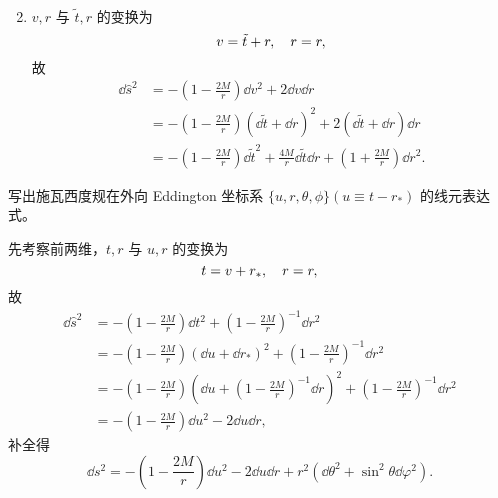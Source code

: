 \begin{xiti}
\begin{zm}
\begin{enumerate}
\begin{align*}
				\end{align*}
			\item $v, r$ 与 $\tilde{t}, r$ 的变换为
				\begin{equation*}
					v = \tilde{t} + r \qc r =r,
				\end{equation*}
				故
				\begin{align*}
					\dd \hat{s}^2 &= - \left( 1 - \frac{2M}{r} \right) \dd{v}^2 + 2 \dd{v} \dd{r}\\
					&= - \left( 1 - \frac{2M}{r} \right) \left( \dd{\tilde{t}} + \dd{r} \right)^2 + 2 \left( \dd{\tilde{t}} + \dd{r} \right) \dd{r}\\
					&= - \left( 1 - \frac{2M}{r} \right) \dd{\tilde{t}}^2 + \frac{4M}{r} \dd{\tilde{t}} \dd{r} + \left( 1 + \frac{2M}{r} \right) \dd{r}^2.
				\end{align*}
		\end{enumerate}
	\end{zm}

	\item 写出施瓦西度规在外向 Eddington 坐标系 $\{ u,r, \theta, \phi \}(u \equiv t - r_*)$ 的线元表达式。

	\begin{jie}
		先考察前两维，$t,r$ 与 $u,r$ 的变换为
		\begin{equation*}
			t = v + r_* \qc r = r,
		\end{equation*}
		故
		\begin{align*}
			\dd \hat{s}^2 &= - \left( 1 - \frac{2M}{r} \right) \dd t^2 + \left( 1 - \frac{2M}{r} \right)^{-1} \dd{r}^2\\
			&= - \left( 1 - \frac{2M}{r} \right) \left( \dd{u} + \dd{r_*} \right)^2 + \left( 1 - \frac{2M}{r} \right)^{-1} \dd{r}^2\\
			&= - \left( 1 - \frac{2M}{r} \right) \left( \dd{u} + \left( 1 - \frac{2M}{r} \right)^{-1} \dd{r} \right)^2 + \left( 1 - \frac{2M}{r} \right)^{-1} \dd{r}^2\\
			&= - \left( 1 - \frac{2M}{r} \right) \dd{u}^2 - 2 \dd{u} \dd{r},
		\end{align*}
		补全得
		\begin{equation*}
			\dd s^2 = - \left( 1 - \frac{2M}{r} \right) \dd{u}^2 - 2 \dd{u} \dd{r} + r^2 \left( \dd{\theta}^2 + \sin^2 \theta \dd{\varphi}^2 \right).
		\end{equation*}
	\end{jie}
\end{xiti}
